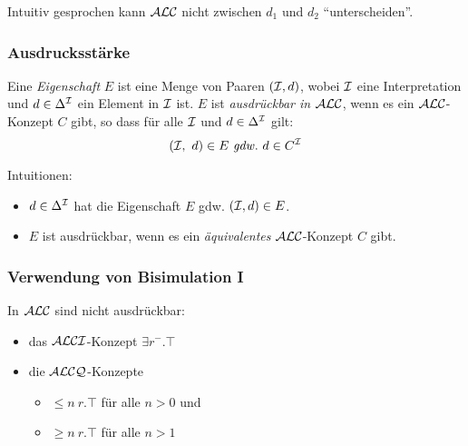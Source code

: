 Intuitiv gesprochen kann $\mathcal{A}\mathcal{L}\mathcal{C}$ nicht zwischen $d_1$ und $d_2$ \enquote{unterscheiden}.

\subsubsection{Ausdrucksstärke}\label{ausdrucksstuxe4rke}

\begin{definition}

Eine \emph{Eigenschaft} $E$ ist eine Menge von Paaren $(\mathcal{I},d)$, wobei
$\mathcal{I}$ eine Interpretation und $d \in \Delta^{\mathcal{I}}$ ein Element in $\mathcal{I}$ ist.
$E$ ist \emph{ausdrückbar in $\mathcal{A}\mathcal{L}\mathcal{C}$}, wenn es ein $\mathcal{A}\mathcal{L}\mathcal{C}$-Konzept $C$
gibt, so dass für alle $\mathcal{I}$ und $d \in \Delta^{\mathcal{I}}$ gilt: 
\[ \left( \MI,\ d \right) \in E \gdw d \in C^\MI \]
\end{definition}

Intuitionen:
\begin{itemize}
    \item $d \in \Delta^{\mathcal{I}}$ hat die Eigenschaft $E$ gdw. $(\mathcal{I}, d) \in E$.
    \item $E$ ist ausdrückbar, wenn es ein \emph{äquivalentes} $\mathcal{A}\mathcal{L}\mathcal{C}$-Konzept $C$ gibt.
\end{itemize}

\subsubsection{Verwendung von Bisimulation I}\label{theorem-3.4}

\begin{theorem}
    \label{thm:beschraenkt}
In $\mathcal{A}\mathcal{L}\mathcal{C}$ sind nicht ausdrückbar: 
\begin{itemize}
\item das $\mathcal{A}\mathcal{L}\mathcal{C}\mathcal{I}$-Konzept $\exists r^{-}.\top$ 
\item die $\mathcal{A}\mathcal{L}\mathcal{C}\mathcal{Q}$-Konzepte
\begin{itemize}
  \item $\leq n\ r.\top$ für alle $n > 0$ und
  \item $\geq n\ r.\top$ für alle $n > 1$
\end{itemize}
\end{itemize}
\end{theorem}


